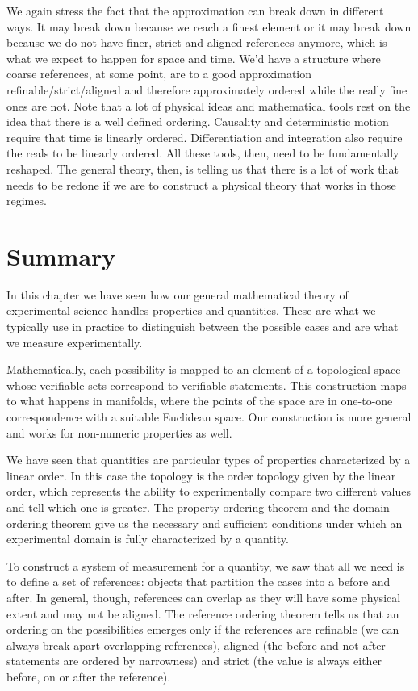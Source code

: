 We again stress the fact that the approximation can break down in different ways. It may break down because we reach a finest element or it may break down because we do not have finer, strict and aligned references anymore, which is what we expect to happen for space and time. We'd have a structure where coarse references, at some point, are to a good approximation refinable/strict/aligned and therefore approximately ordered while the really fine ones are not. Note that a lot of physical ideas and mathematical tools rest on the idea that there is a well defined ordering. Causality and deterministic motion require that time is linearly ordered. Differentiation and integration also require the reals to be linearly ordered. All these tools, then, need to be fundamentally reshaped. The general theory, then, is telling us that there is a lot of work that needs to be redone if we are to construct a physical theory that works in those regimes.


\section{Summary}

In this chapter we have seen how our general mathematical theory of experimental science handles properties and quantities. These are what we typically use in practice to distinguish between the possible cases and are what we measure experimentally.

Mathematically, each possibility is mapped to an element of a topological space whose verifiable sets correspond to verifiable statements. This construction maps to what happens in manifolds, where the points of the space are in one-to-one correspondence with a suitable Euclidean space. Our construction is more general and works for non-numeric properties as well.

We have seen that quantities are particular types of properties characterized by a linear order. In this case the topology is the order topology given by the linear order, which represents the ability to experimentally compare two different values and tell which one is greater. The property ordering theorem and the domain ordering theorem give us the necessary and sufficient conditions under which an experimental domain is fully characterized by a quantity.

To construct a system of measurement for a quantity, we saw that all we need is to define a set of references: objects that partition the cases into a before and after. In general, though, references can overlap as they will have some physical extent and may not be aligned. The reference ordering theorem tells us that an ordering on the possibilities emerges only if the references are refinable (we can always break apart overlapping references), aligned (the before and not-after statements are ordered by narrowness) and strict (the value is always either before, on or after the reference).

